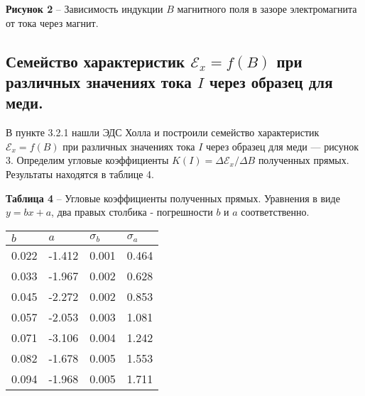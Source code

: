 \documentclass[12pt,a4paper]{article}
\begin{document}
	    \textbf{Рисунок 2} -- Зависимость индукции $B$ магнитного поля в зазоре электромагнита от тока через магнит.
        
    \subsection{Семейство характеристик $\mathcal{E}_x = f(B)$ при различных значениях тока $I$ через образец для меди.}
        В пункте 3.2.1 нашли ЭДС Холла и построили семейство характеристик $\mathcal{E}_x = f(B)$ при различных значениях тока $I$ через образец для меди --- рисунок 3. Определим угловые коэффициенты $K(I) = \Delta \mathcal{E}_x/\Delta B$ полученных прямых. Результаты находятся в таблице 4.
        
        \begin{table}[!h]
            \begin{flushleft}%
           		\textbf{Таблица 4} -- Угловые коэффициенты полученных прямых. Уравнения в виде $y = bx + a$, два правых столбика - погрешности $b$ и $a$ соответственно.\\
            \end{flushleft}
            \begin{center}
                \begin{tabular}{ | l | l | l | l |}
                    \hline
                    $b$      &   $a$    &   $\sigma_b$&   $\sigma_a$\\
                    \hline
                    0.022   &   -1.412  &   0.001   &   0.464   \\
                    \hline      
                    0.033   &   -1.967  &   0.002   &   0.628   \\
                    \hline    
                    0.045   &   -2.272  &   0.002   &   0.853   \\
                    \hline 
                    0.057   &   -2.053  &   0.003   &   1.081   \\
                    \hline 
                    0.071   &   -3.106  &   0.004   &   1.242   \\
                    \hline 
                    0.082   &   -1.678  &   0.005   &   1.553   \\
                    \hline 
                    0.094   &   -1.968  &   0.005   &   1.711   \\
                    \hline    
                \end{tabular}
            \end{center}
        \end{table}
    
\end{document}
